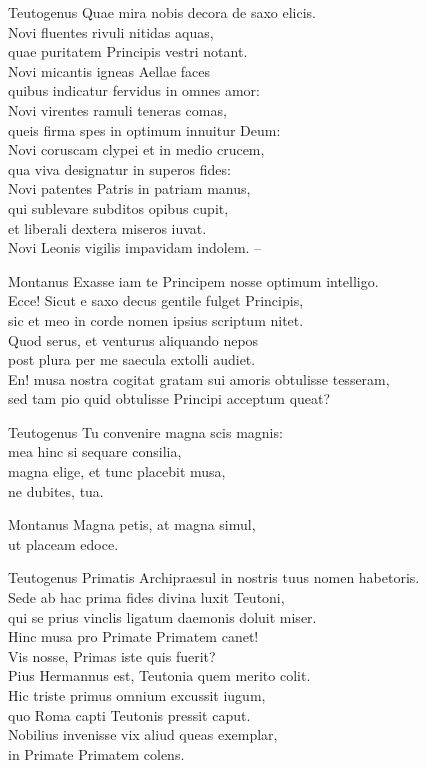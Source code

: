 \documentclass{ees}
\begin{document}
{\begin{lyrics}
  \item[Teutogenus]
  Quae mira nobis decora de saxo elicis.\\
  Novi fluentes rivuli nitidas aquas,\\
  quae puritatem Principis vestri notant.\\
  Novi micantis igneas Aellae faces\\
  quibus indicatur fervidus in omnes amor:\\
  Novi virentes ramuli teneras comas,\\
  queis firma spes in optimum innuitur Deum:\\
  Novi coruscam clypei et in medio crucem,\\
  qua viva designatur in superos fides:\\
  Novi patentes Patris in patriam manus,\\
  qui sublevare subditos opibus cupit,\\
  et liberali dextera miseros iuvat.\\
  Novi Leonis vigilis impavidam indolem. –

  \item[Montanus]
  Exasse iam te Principem nosse optimum intelligo.\\
  Ecce! Sicut e saxo decus gentile fulget Principis,\\
  sic et meo in corde nomen ipsius scriptum nitet.\\
  Quod serus, et venturus aliquando nepos\\
  post plura per me saecula extolli audiet.\\
  En! musa nostra cogitat gratam sui amoris obtulisse tesseram,\\
  sed tam pio quid obtulisse Principi acceptum queat?

  \item[Teutogenus]
  Tu convenire magna scis magnis:\\
  mea hinc si sequare consilia,\\
  magna elige, et tunc placebit musa,\\
  ne dubites, tua.

  \item[Montanus]
  Magna petis, at magna simul,\\
  ut placeam edoce.

  \item[Teutogenus]
  Primatis Archipraesul in nostris tuus nomen habetoris.\\
  Sede ab hac prima fides divina luxit Teutoni,\\
  qui se prius vinclis ligatum daemonis doluit miser.\\
  Hinc musa pro Primate Primatem canet!\\
  Vis nosse, Primas iste quis fuerit?\\
  Pius Hermannus est, Teutonia quem merito colit.\\
  Hic triste primus omnium excussit iugum,\\
  quo Roma capti Teutonis pressit caput.\\
  Nobilius invenisse vix aliud queas exemplar,\\
  in Primate Primatem colens.


\end{lyrics}}
\end{document}
